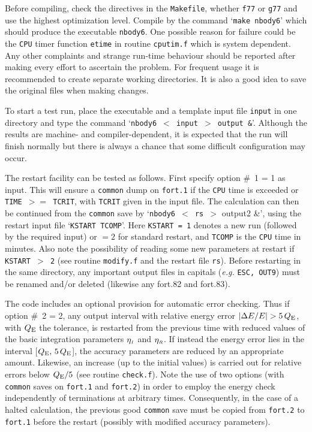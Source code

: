 \documentclass[12pt]{article}
\begin{document}
Before compiling, check the {} directives in the {\tt Makefile},
\ie whether {\tt f77} or {\tt g77} and use the highest optimization level.
Compile by the command `{\tt make nbody6}' which should produce the
executable {\tt nbody6}.
One possible reason for failure could be the {\tt CPU} timer function
{\tt etime} in routine {\tt cputim.f} which is system dependent.
Any other complaints and strange run-time behaviour should be reported after
making every effort to ascertain the problem.
For frequent usage it is recommended to create separate working directories.
It is also a good idea to save the original files when making changes.

To start a test run, place the executable and a template input file
{\tt input} in one directory and type the command
`{\tt nbody6 $<$ input $>$ output \&}'.
Although the results are machine- and compiler-dependent, it is expected that
the run will finish normally but there is always a chance that some difficult
configuration may occur.

The restart facility can be tested as follows.
First specify option \#~1 = 1 as input.
This will ensure a {\tt common} dump on {\tt fort.1} if the {\tt CPU} time is
exceeded or {\tt TIME $>=$ TCRIT}, with {\tt TCRIT} given in the input file.
The calculation can then be continued from the {\tt common} save by
`{\tt nbody6 $<$ rs $>$} output2 \&',
using the restart input file `{\tt KSTART TCOMP}'.
Here {\tt KSTART = 1} denotes a new run (followed by the required input)
or $= 2$ for standard restart, and {\tt TCOMP} is the {\tt CPU} time in
minutes.
Also note the possibility of reading some new parameters at restart if
{\tt KSTART $>$ 2} (see routine {\tt modify.f} and the restart
file {\tt rs}).
Before restarting in the same directory, any important output files in
capitals ({\it e.g.} {\tt ESC, OUT9}) must be renamed and/or deleted
(likewise any fort.82 and fort.83).

The code includes an optional provision for automatic error checking.
Thus if option \#~2 = 2, any output interval with relative energy error
$\vert \Delta E / E \vert > 5 \,Q_{\rm E}$, with $Q_{\rm E}$ the tolerance,
is restarted from the previous time with reduced values of the basic
integration parameters $\eta_{\scriptscriptstyle I}$ and $\eta_{\scriptscriptstyle R}$.
If instead the energy error lies in the interval
[$Q_{\rm E},\, 5\,Q_{\rm E}$], the accuracy parameters are reduced by an
appropriate amount.
Likewise, an increase (up to the initial values) is carried out for relative
errors below $Q_{\rm E} / 5$ (see routine {\tt check.f}).
Note the use of two options (with {\tt common} saves on {\tt fort.1} and
{\tt fort.2}) in order to employ the energy check independently of
terminations at arbitrary times.
Consequently, in the case of a halted calculation, the previous good
{\tt common} save must be copied from {\tt fort.2} to {\tt fort.1} before 
the restart (possibly with modified accuracy parameters).
\end{document}
